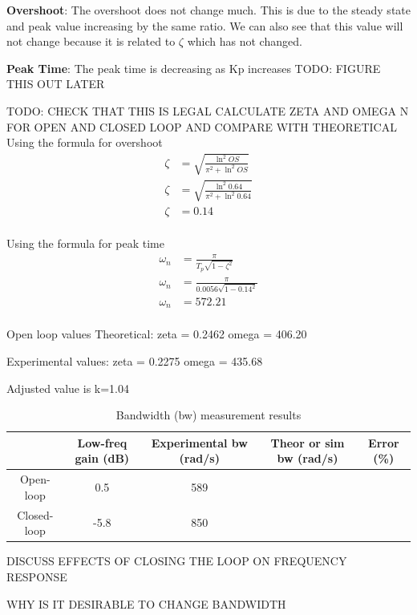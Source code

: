 \documentclass{article}
\begin{document}
\textbf{Overshoot}: The overshoot does not change much. This is due to the steady state and peak value increasing by the same ratio. We can also see that this value will not change because it is related to $\zeta$ which has not changed.

\textbf{Peak Time}: The peak time is decreasing as Kp increases
TODO: FIGURE THIS OUT LATER


TODO: CHECK THAT THIS IS LEGAL
CALCULATE ZETA AND OMEGA N FOR OPEN AND CLOSED LOOP AND COMPARE WITH THEORETICAL
Using the formula for overshoot
\begin{align*}
    \zeta &= \sqrt{\frac{\ln^2 {OS}}{\pi^2 +\ln^2 {OS}}} \\
    \zeta &= \sqrt{\frac{\ln^2 {0.64}}{\pi^2 +\ln^2 {0.64}}} \\
    \zeta &=  0.14\\
\end{align*}

Using the formula for peak time
\begin{align*}
    \omega_n &= \frac{\pi}{T_p\sqrt{1-\zeta^2}}\\
    \omega_n &= \frac{\pi}{0.0056\sqrt{1-0.14^2}}\\
    \omega_n &= 572.21\\
\end{align*}

Open loop values
Theoretical: zeta = 0.2462 omega = 406.20

Experimental values: zeta = 0.2275 omega = 435.68


Adjusted value is k=1.04


\begin{table}[ht]
\centering
    \begin{tabular}{|c|c|c|c|c|}
        \hline
        & Low-freq gain (dB) & Experimental bw (rad/s) & Theor or sim bw (rad/s) & Error (\%)\\
        \hline
        Open-loop & 0.5 & 589 & & \\
        \hline
        Closed-loop & -5.8 & 850 & & \\
        \hline
    \end{tabular}
    \caption{Bandwidth (bw) measurement results}
\end{table}

DISCUSS EFFECTS OF CLOSING THE LOOP ON FREQUENCY RESPONSE

WHY IS IT DESIRABLE TO CHANGE BANDWIDTH
\end{document}
